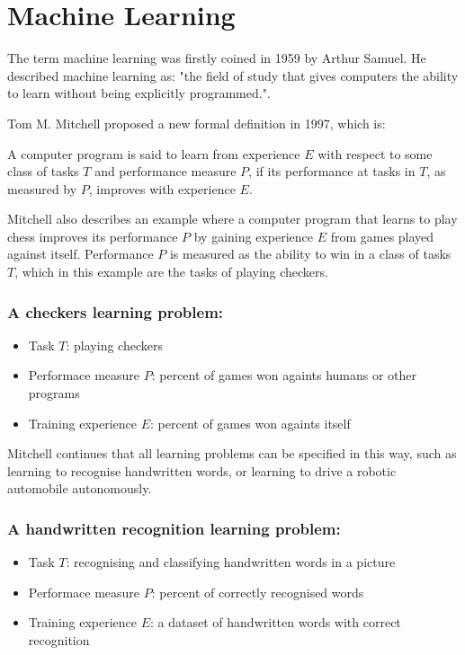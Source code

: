 \chapter{Machine Learning}

The term machine learning was firstly coined in 1959 by Arthur Samuel. He described machine learning as: "the field of study that gives computers the ability to learn without being explicitly programmed."\cite{machine-learning-samuel}.

Tom M. Mitchell proposed a new formal definition in 1997\cite{machine-learning-mitchell}, which is:
\begin{definition}
A computer program is said to learn from experience $E$ with respect to some class of tasks $T$ and performance measure $P$, if its performance at tasks in $T$, as measured by $P$, improves with experience $E$.
\end{definition} 

Mitchell also describes an example where a computer program that learns to play chess improves its performance $P$ by gaining experience $E$ from games played against itself. Performance $P$ is measured as the ability to win in a class of tasks $T$, which in this example are the tasks of playing checkers.

\subsection*{A checkers learning problem:}

\begin{itemize}
    \item Task $T$: playing checkers
    \item Performace measure $P$: percent of games won againts humans or other programs
    \item Training experience $E$: percent of games won againts itself
\end{itemize}


Mitchell continues that all learning problems can be specified in this way, such as learning to recognise handwritten words, or learning to drive a robotic automobile autonomously.

\subsection*{A handwritten recognition learning problem:}

\begin{itemize}
    \item Task $T$: recognising and classifying handwritten words in a picture
    \item Performace measure $P$: percent of correctly recognised words
    \item Training experience $E$: a dataset of handwritten words with correct recognition
\end{itemize}

